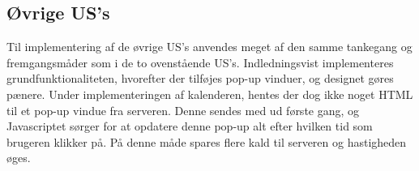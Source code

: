 \subsection{Øvrige US's}
Til implementering af de øvrige US's anvendes meget af den samme tankegang og fremgangsmåder som i de to ovenstående US's. Indledningsvist implementeres grundfunktionaliteten, hvorefter der tilføjes pop-up vinduer, og designet gøres pænere. Under implementeringen af kalenderen, hentes der dog ikke noget HTML til et pop-up vindue fra serveren. Denne sendes med ud første gang, og Javascriptet sørger for at opdatere denne pop-up alt efter hvilken tid som brugeren klikker på. På denne måde spares flere kald til serveren og hastigheden øges. 



















